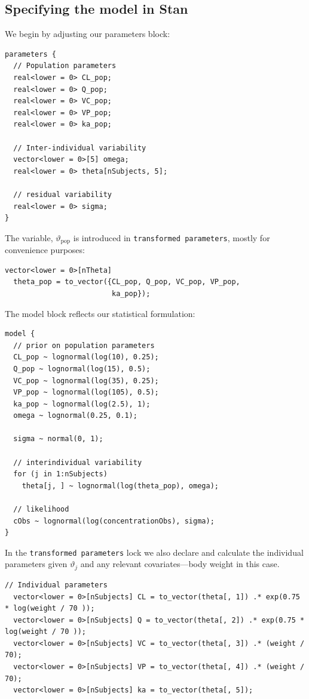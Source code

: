 \subsection{Specifying the model in Stan}

We begin by adjusting our parameters block:
\begin{lstlisting}[style=stan, numbers=none]
parameters {
  // Population parameters
  real<lower = 0> CL_pop;
  real<lower = 0> Q_pop;
  real<lower = 0> VC_pop;
  real<lower = 0> VP_pop;
  real<lower = 0> ka_pop;

  // Inter-individual variability
  vector<lower = 0>[5] omega;
  real<lower = 0> theta[nSubjects, 5];

  // residual variability
  real<lower = 0> sigma;
}
\end{lstlisting}
%
The variable, $\vartheta_\mathrm{pop}$ is introduced in \texttt{transformed parameters},
mostly for convenience purposes:
\begin{lstlisting}[style=stan, numbers=none]
vector<lower = 0>[nTheta]  
  theta_pop = to_vector({CL_pop, Q_pop, VC_pop, VP_pop, 
                         ka_pop});
\end{lstlisting}
%
The model block reflects our statistical formulation:
\begin{lstlisting}[style=stan, numbers=none] 
model {
  // prior on population parameters
  CL_pop ~ lognormal(log(10), 0.25); 
  Q_pop ~ lognormal(log(15), 0.5);
  VC_pop ~ lognormal(log(35), 0.25);
  VP_pop ~ lognormal(log(105), 0.5);
  ka_pop ~ lognormal(log(2.5), 1);
  omega ~ lognormal(0.25, 0.1);
  
  sigma ~ normal(0, 1);

  // interindividual variability
  for (j in 1:nSubjects)
    theta[j, ] ~ lognormal(log(theta_pop), omega);

  // likelihood
  cObs ~ lognormal(log(concentrationObs), sigma);
}
\end{lstlisting}
%

In the \texttt{transformed parameters} lock we also declare and
calculate the individual parameters given $\vartheta_j$ and any
relevant covariates---body weight in this case.
\begin{lstlisting}[style=stan, numbers=none] 
  // Individual parameters
  vector<lower = 0>[nSubjects] CL = to_vector(theta[, 1]) .* exp(0.75 * log(weight / 70 ));
  vector<lower = 0>[nSubjects] Q = to_vector(theta[, 2]) .* exp(0.75 * log(weight / 70 ));
  vector<lower = 0>[nSubjects] VC = to_vector(theta[, 3]) .* (weight / 70);
  vector<lower = 0>[nSubjects] VP = to_vector(theta[, 4]) .* (weight / 70);
  vector<lower = 0>[nSubjects] ka = to_vector(theta[, 5]);
\end{lstlisting}

